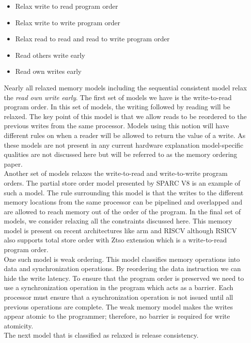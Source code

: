 \documentclass[a4paper, 11pt, twocolumn]{article}
\theoremstyle{nonumberplain}
\begin{document}
\begin{itemize}
    \item Relax write to read program order
    \item Relax write to write program order
    \item Relax read to read and read to write program order
    \item Read others write early
    \item Read own writes early
\end{itemize}

Nearly all relaxed memory models including the sequential consistent model
relax the \textit{read own write early}.
The first set of models we have is the write-to-read program order.
In this set of models, the writing followed by reading will be relaxed.
The key point of this model is that we allow reads to be reordered to the
previous writes from the same processor. Models using this
notion will have different rules on when a reader will be allowed to return
the value of a write. As these models are not present in any current
hardware explanation model-specific qualities are not discussed here but
will be referred to as the memory ordering\cite{ordering} paper. \\
Another set of models relaxes the write-to-read and write-to-write
program orders. The partial store order model presented by SPARC V8 is an
example of such a model. The rule surrounding this model is that the writes to
the different memory locations from the same processor can be pipelined and
overlapped and are allowed to reach memory out of the order of the program.
In the final set of models, we consider relaxing all the constraints discussed
here. This memory model is present on recent architectures like arm and RISCV
although RSICV also supports total store order with Ztso extension which is a
write-to-read program order. \\
One such model is weak ordering. This model classifies memory
operations into data and synchronization operations. By reordering the
data instruction we can hide the write latency. To ensure that the
program order is preserved we need to use a synchronization operation in the
program which acts as a barrier. Each processor must ensure that a
synchronization operation is not issued until all previous operations are
complete. The weak memory model makes the writes appear atomic to the
programmer; therefore, no barrier is required for write atomicity. \\
The next model that is classified as relaxed is release consistency.
\end{document}
